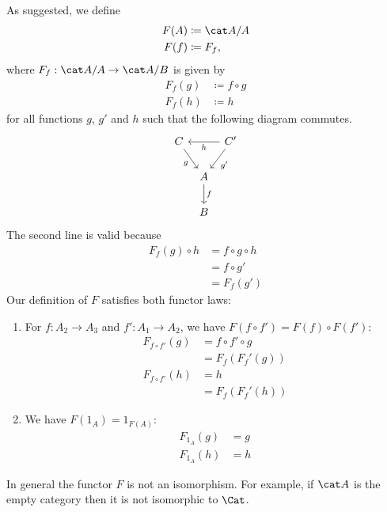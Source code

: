 \begin{answer}
  As suggested, we define
  \begin{align*}
    F(A) &\coloneqq \A / A \\
    F(f) &\coloneqq F_f,
  \end{align*}
  where $F_f : \A / A \to \A / B$ is given by
  \begin{align*}
    F_f(g) &\coloneqq f \circ g \\
    F_f(h) &\coloneqq h
  \end{align*}
  for all functions $g$, $g'$ and $h$ such that the following diagram commutes.
  \[ \begin{tikzcd}[column sep=tiny]
    C \arrow[dr, "g"'] && C' \arrow[ll, "h"] \arrow[dl, "g'"] \\
    & A \arrow[d, "f"] \\
    & B
  \end{tikzcd} \]
  The second line is valid because
  \[ \begin{split}
    F_f(g) \circ h
    &= f \circ g \circ h \\
    &= f \circ g' \\
    &= F_f(g')
  \end{split} \]
  Our definition of $F$ satisfies both functor laws:
  \begin{enumerate}
    \item For $f : A_2 \to A_3$ and $f' : A_1 \to A_2$, we have $F(f \circ f') = F(f) \circ F(f')$:
      \begin{align*}
        F_{f \circ f'}(g)
          &= f \circ f' \circ g \\
          &= F_f(F_f'(g)) \\
        F_{f \circ f'}(h)
          &= h \\
          &= F_f(F_f'(h))
      \end{align*}
    \item We have $F(1_A) = 1_{F(A)}$:
      \begin{align*}
        F_{1_A}(g) &= g \\
        F_{1_A}(h) &= h
      \end{align*}
  \end{enumerate}
  In general the functor $F$ is not an isomorphism.
  For example, if $\A$ is the empty category then it is not isomorphic to $\Cat$.
\end{answer}






